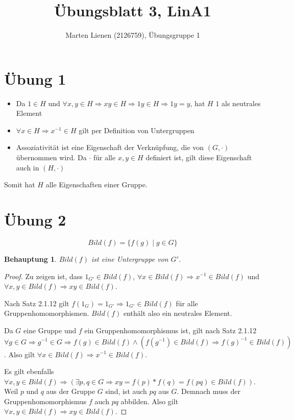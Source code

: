 \documentclass[a4paper,10pt]{article}
\title{Übungsblatt 3, LinA1}
\author{Marten Lienen (2126759), Übungsgruppe 1}
\newtheorem*{claim}{Behauptung}
\begin{document}
\maketitle

\section*{Übung 1}

\begin{itemize}
 \item Da $1 \in H$ und $\forall x, y \in H \Rightarrow xy \in H \Rightarrow 1y \in H \Rightarrow 1y = y$, hat $H$ $1$ als neutrales Element
 \item $\forall x \in H \Rightarrow x^{-1} \in H$ gilt per Definition von Untergruppen
 \item Assoziativität ist eine Eigenschaft der Verknüpfung, die von $(G, \cdot)$ übernommen wird.
 Da $\cdot$ für alle $x, y \in H$ definiert ist, gilt diese Eigenschaft auch in $(H, \cdot)$
\end{itemize}

Somit hat $H$ alle Eigenschaften einer Gruppe.

\section*{Übung 2}

\begin{equation*}
 Bild(f) = \{f(g) \mid g \in G\}
\end{equation*}

\begin{claim}
 $Bild(f)$ ist eine Untergruppe von $G'$.
\end{claim}

\begin{proof}
 Zu zeigen ist, dass $1_{G'} \in Bild(f)$, $\forall x \in Bild(f) \Rightarrow x^{-1} \in Bild(f)$ und $\forall x, y \in Bild(f) \Rightarrow xy \in Bild(f)$.
 
 Nach Satz 2.1.12 gilt $f(1_G) = 1_{G'} \Rightarrow 1_{G'} \in Bild(f)$ für alle Gruppenhomomorphismen.
 $Bild(f)$ enthält also ein neutrales Element.
 
 Da $G$ eine Gruppe und $f$ ein Gruppenhomomorphismus ist, gilt nach Satz 2.1.12 $\forall g \in G \Rightarrow g^{-1} \in G \Rightarrow f(g) \in Bild(f) \land (f(g^{-1}) \in Bild(f) \Rightarrow f(g)^{-1} \in Bild(f))$.
 Also gilt $\forall x \in Bild(f) \Rightarrow x^{-1} \in Bild(f)$.
 
 Es gilt ebenfalls $\forall x, y \in Bild(f) \Rightarrow (\exists p, q \in G \Rightarrow xy = f(p) * f(q) = f(pq) \in Bild(f))$.
 Weil $p$ und $q$ aus der Gruppe $G$ sind, ist auch $pq$ aus $G$.
 Demnach muss der Gruppenhomomorphismus $f$ auch $pq$ abbilden.
 Also gilt $\forall x, y \in Bild(f) \Rightarrow xy \in Bild(f)$.
\end{proof}
\end{document}
